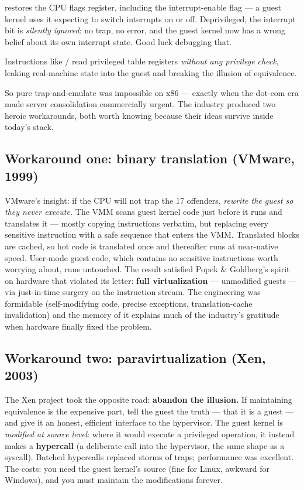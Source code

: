 \begin{tbbitemize}
  \item {} restores the CPU flags register, including the interrupt-enable flag — a guest kernel uses it expecting to switch interrupts on or off. Deprivileged, the interrupt bit is \textit{silently ignored}: no trap, no error, and the guest kernel now has a wrong belief about its own interrupt state. Good luck debugging that.
  \item Instructions like / read privileged table registers \textit{without any privilege check}, leaking real-machine state into the guest and breaking the illusion of equivalence.
\end{tbbitemize}

So pure trap-and-emulate was impossible on x86 — exactly when the dot-com era made server consolidation commercially urgent. The industry produced two heroic workarounds, both worth knowing because their ideas survive inside today's stack.

\subsection*{Workaround one: binary translation (VMware, 1999)}

VMware's insight: if the CPU will not trap the 17 offenders, \textit{rewrite the guest so they never execute.} The VMM scans guest kernel code just before it runs and translates it — mostly copying instructions verbatim, but replacing every sensitive instruction with a safe sequence that enters the VMM. Translated blocks are cached, so hot code is translated once and thereafter runs at near-native speed. User-mode guest code, which contains no sensitive instructions worth worrying about, runs untouched. The result satisfied Popek \& Goldberg's spirit on hardware that violated its letter: \textbf{full virtualization} — unmodified guests — via just-in-time surgery on the instruction stream. The engineering was formidable (self-modifying code, precise exceptions, translation-cache invalidation) and the memory of it explains much of the industry's gratitude when hardware finally fixed the problem.

\subsection*{Workaround two: paravirtualization (Xen, 2003)}

The Xen project took the opposite road: \textbf{abandon the illusion.} If maintaining equivalence is the expensive part, tell the guest the truth — that it is a guest — and give it an honest, efficient interface to the hypervisor. The guest kernel is \textit{modified at source level}: where it would execute a privileged operation, it instead makes a \textbf{hypercall} (a deliberate call into the hypervisor, the same shape as a syscall). Batched hypercalls replaced storms of traps; performance was excellent. The costs: you need the guest kernel's source (fine for Linux, awkward for Windows), and you must maintain the modifications forever.

